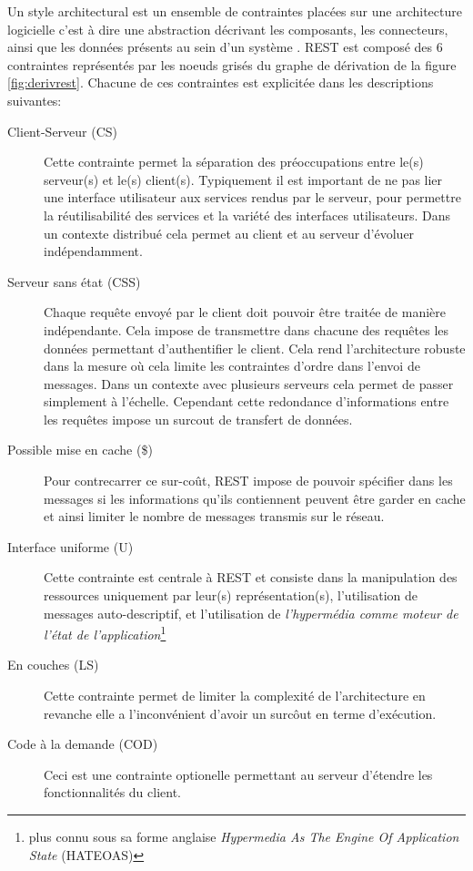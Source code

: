 \documentclass[a4paper, 11pt]{report}
\begin{document}
Un style architectural est un ensemble de contraintes placées sur une
architecture logicielle c'est à dire une abstraction décrivant les
composants, les connecteurs, ainsi que les données présents au sein
d'un système \cite{perry1992foundations}. REST est composé des 6
contraintes représentés par les noeuds grisés du graphe de dérivation
de la figure \ref{fig:derivrest}.  Chacune de ces contraintes est
explicitée dans les descriptions suivantes:

\begin{description}
\item[Client-Serveur (CS)] Cette contrainte permet la séparation des
  préoccupations entre le(s) serveur(s) et le(s) client(s).
  Typiquement il est important de ne pas lier une interface
  utilisateur aux services rendus par le serveur, pour permettre la
  réutilisabilité des services et la variété des interfaces
  utilisateurs.  Dans un contexte distribué cela permet au client et
  au serveur d'évoluer indépendamment.

\item[Serveur sans état (CSS)] Chaque requête envoyé par le client
  doit pouvoir être traitée de manière indépendante.  Cela impose de
  transmettre dans chacune des requêtes les données permettant
  d'authentifier le client.  Cela rend l'architecture robuste dans la
  mesure où cela limite les contraintes d'ordre dans l'envoi de
  messages.  Dans un contexte avec plusieurs serveurs cela permet de
  passer simplement à l'échelle.  Cependant cette redondance
  d'informations entre les requêtes impose un surcout de transfert de
  données.

\item [Possible mise en cache (\$)] Pour contrecarrer ce sur-coût,
  REST impose de pouvoir spécifier dans les messages si les
  informations qu'ils contiennent peuvent être garder en cache et
  ainsi limiter le nombre de messages transmis sur le réseau.

\item[Interface uniforme (U)] Cette contrainte est centrale à REST et
  consiste dans la manipulation des ressources uniquement par leur(s)
  représentation(s), l'utilisation de messages auto-descriptif, et
  l'utilisation de \emph{l'hypermédia comme moteur de l'état de
    l'application}\footnote{plus connu sous sa forme anglaise
    \emph{Hypermedia As The Engine Of Application State} (HATEOAS)}

\item[En couches (LS)] Cette contrainte permet de limiter la
  complexité de l'architecture en revanche elle a l'inconvénient
  d'avoir un surcôut en terme d'exécution.

\item[Code à la demande (COD)] Ceci est une contrainte optionelle
  permettant au serveur d'étendre les fonctionnalités du client.
\end{description}
\end{document}
